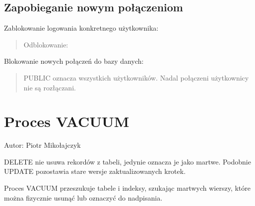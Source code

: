 \documentclass[a4paper,11pt,polish]{sphinxmanual}
\begin{document}
\subsection{Zapobieganie nowym połączeniom}
\label{\detokenize{Kontrola_i_konserwacja/kontrola_i_konserwacja:zapobieganie-nowym-polaczeniom}}
\sphinxAtStartPar
Zablokowanie logowania konkretnego użytkownika:
\begin{quote}

\begin{sphinxVerbatim}[commandchars=\\\{\}]
\end{sphinxVerbatim}

\sphinxAtStartPar
Odblokowanie:

\begin{sphinxVerbatim}[commandchars=\\\{\}]
\end{sphinxVerbatim}
\end{quote}

\sphinxAtStartPar
Blokowanie nowych połączeń do bazy danych:
\begin{quote}

\begin{sphinxVerbatim}[commandchars=\\\{\}]
\end{sphinxVerbatim}

\sphinxAtStartPar
PUBLIC oznacza wszystkich użytkowników. Nadal połączeni użytkownicy nie są rozłączani.
\end{quote}


\section{Proces VACUUM}
\label{\detokenize{Kontrola_i_konserwacja/kontrola_i_konserwacja:proces-vacuum}}
\sphinxAtStartPar
Autor: Piotr Mikołajczyk

\sphinxAtStartPar
DELETE nie usuwa rekordów z tabeli, jedynie oznacza je jako martwe. Podobnie UPDATE pozostawia stare wersje zaktualizowanych krotek.

\sphinxAtStartPar
Proces VACUUM przeszukuje tabele i indeksy, szukając martwych wierszy, które można fizycznie usunąć lub oznaczyć do nadpisania.
\end{document}
